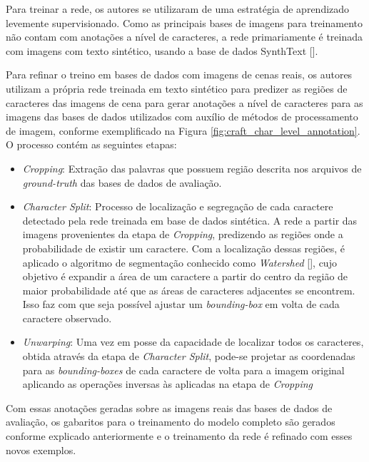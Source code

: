 Para treinar a rede, os autores se utilizaram de uma estratégia de aprendizado levemente supervisionado. Como as principais bases de imagens para treinamento não contam com anotações a nível de caracteres, a rede primariamente é treinada com imagens com texto sintético, usando a base de dados SynthText [].

Para refinar o treino em bases de dados com imagens de cenas reais, os autores utilizam a própria rede treinada em texto sintético para predizer as regiões de caracteres das imagens de cena para gerar anotações a nível de caracteres para as imagens das bases de dados utilizados com auxílio de métodos de processamento de imagem, conforme exemplificado na Figura \ref{fig:craft_char_level_annotation}. O processo contém as seguintes etapas:

\begin{itemize}
    \item \textit{Cropping}: Extração das palavras que possuem região descrita nos arquivos de \textit{ground-truth} das bases de dados de avaliação.
    \item \textit{Character Split}: Processo de localização e segregação de cada caractere detectado pela rede treinada em base de dados sintética. A rede a partir das imagens provenientes da etapa de \textit{Cropping}, predizendo as regiões onde a probabilidade de existir um caractere. Com a localização dessas regiões, é aplicado o algoritmo de segmentação conhecido como \textit{Watershed} [], cujo objetivo é expandir a área de um caractere a partir do centro da região de maior probabilidade até que as áreas de caracteres adjacentes se encontrem. Isso faz com que seja possível ajustar um \textit{bounding-box} em volta de cada caractere observado.
    \item \textit{Unwarping}: Uma vez em posse da capacidade de localizar todos os caracteres, obtida através da etapa de \textit{Character Split}, pode-se projetar as coordenadas para as \textit{bounding-boxes} de cada caractere de volta para a imagem original aplicando as operações inversas às aplicadas na etapa de \textit{Cropping}
\end{itemize}

Com essas anotações geradas sobre as imagens reais das bases de dados de avaliação, os gabaritos para o treinamento do modelo completo são gerados conforme explicado anteriormente e o treinamento da rede é refinado com esses novos exemplos.

